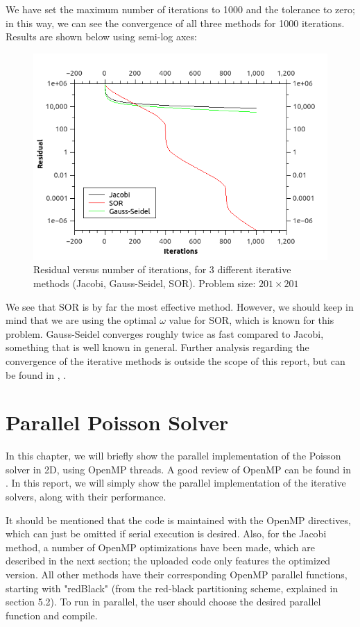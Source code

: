 \documentclass[11pt]{report}
\begin{document}
We have set the maximum number of iterations to 1000 and the tolerance to zero; in this way, we can see the convergence of all three methods for 1000 iterations. Results are shown below using semi-log axes:
\newline

\begin{figure}[h!]
\centering
\includegraphics[width=0.75\linewidth]{images/residual}
\caption{Residual versus number of iterations, for 3 different iterative methods (Jacobi, Gauss-Seidel, SOR). Problem size: $201 \times 201$}
\label{fig:residual}
\end{figure}

We see that SOR is by far the most effective method. However, we should keep in mind that we are using the optimal $\omega$ value for SOR, which is known for this problem. Gauss-Seidel converges roughly twice as fast compared to Jacobi, something that is well known in general. Further analysis regarding the convergence of the iterative methods is outside the scope of this report, but can be found in \cite{leveque}, \cite{karniadakis}.

\chapter{Parallel Poisson Solver}
In this chapter, we will briefly show the parallel implementation of the Poisson solver in 2D, using OpenMP threads. A good review of OpenMP can be found in \cite{usingopenmp}. In this report, we will simply show the parallel implementation of the iterative solvers, along with their performance.

It should be mentioned that the code is maintained with the OpenMP directives, which can just be omitted if serial execution is desired. Also, for the Jacobi method, a number of OpenMP optimizations have been made, which are described in the next section; the uploaded code only features the optimized version. All other methods have their corresponding OpenMP parallel functions, starting with "redBlack" (from the red-black partitioning scheme, explained in section 5.2). To run in parallel, the user should choose the desired parallel function and compile.
\end{document}
